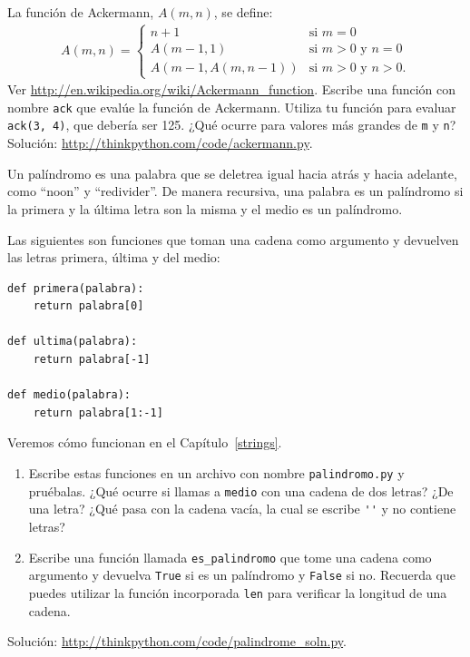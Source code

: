 \documentclass[10pt]{book}
\begin{document}
\begin{exercise}
\label{ackermann}

La función de Ackermann, $A(m, n)$, se define:
\begin{eqnarray*}
A(m, n) = \begin{cases}
              n+1 & \mbox{si } m = 0 \\
        A(m-1, 1) & \mbox{si } m > 0 \mbox{ y } n = 0 \\
A(m-1, A(m, n-1)) & \mbox{si } m > 0 \mbox{ y } n > 0.
\end{cases}
\end{eqnarray*}
%
Ver \url{http://en.wikipedia.org/wiki/Ackermann_function}.
Escribe una función con nombre {\tt ack} que evalúe la función de Ackermann.
Utiliza tu función para evaluar {\tt ack(3, 4)}, que debería ser 125.
¿Qué ocurre para valores más grandes de {\tt m} y {\tt n}?
Solución: \url{http://thinkpython.com/code/ackermann.py}.

\end{exercise}


\begin{exercise}
\label{palindrome}

Un palíndromo es una palabra que se deletrea igual hacia atrás y
hacia adelante, como ``noon'' y ``redivider''.  De manera recursiva, una palabra
es un palíndromo si la primera y la última letra son la misma
y el medio es un palíndromo.

Las siguientes son funciones que toman una cadena como argumento y
devuelven las letras primera, última y del medio:

\begin{verbatim}
def primera(palabra):
    return palabra[0]

def ultima(palabra):
    return palabra[-1]

def medio(palabra):
    return palabra[1:-1]
\end{verbatim}
%
Veremos cómo funcionan en el Capítulo~\ref{strings}.

\begin{enumerate}

\item Escribe estas funciones en un archivo con nombre {\tt palindromo.py}
y pruébalas.  ¿Qué ocurre si llamas a {\tt medio} con
una cadena de dos letras?  ¿De una letra?  ¿Qué pasa con la cadena
vacía, la cual se escribe \verb"''" y no contiene letras?

\item Escribe una función llamada \verb"es_palindromo" que tome
una cadena como argumento y devuelva {\tt True} si es un palíndromo
y {\tt False} si no.  Recuerda que puedes utilizar la
función incorporada {\tt len} para verificar la longitud de una cadena.

\end{enumerate}

Solución: \url{http://thinkpython.com/code/palindrome_soln.py}.

\end{exercise}
\end{document}
